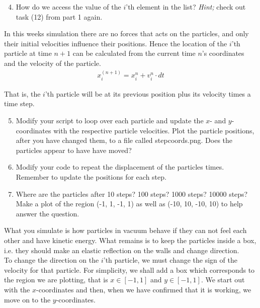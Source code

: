\documentclass{article}
\begin{document}
\begin{enumerate}
  \setcounter{enumi}{3}
  \item How do we access the value of the $i$'th element in the  list?
      {\em Hint;} check out task (12) from part 1 again.

\end{enumerate}

In this weeks simulation there are no forces that acts on the particles,
and only their initial velocities influence their positions.
Hence the location of the $i$'th particle at time $n+1$ can be
calculated from the current time $n$'s coordinates and the velocity of the
particle.
\begin{align}
  x_i^{(n+1)} = x^n_i + v_{i}^n \cdot dt
\end{align}

That is, the $i$'th particle will be at its previous position plus its
velocity times a time step.

\begin{enumerate}
  \setcounter{enumi}{4}
  \item
    Modify your script to loop over each particle and update the $x$- and
    $y$-coordinates with the respective particle velocities.
    Plot the particle positions, after you have changed them,
    to a file called stepcoords.png. Does the particles appear to have have moved?

  \item Modify your code to repeat the displacement of the particles  times.
      Remember to update the positions for each step.

  \item Where are the particles after 10 steps? 100 steps? 1000 steps? 10000 steps?
    Make a plot of the region (-1, 1, -1, 1) as well as (-10, 10, -10, 10) to
    help answer the question.

\end{enumerate}

What you simulate is how particles in vacuum behave if they can not feel
each other and have kinetic energy. What remains is to keep the particles
inside a box, i.e. they should make an elastic reflection on the walls and
change direction. \\

To change the direction on the $i$'th particle, we must change
the sign of the velocity for that particle. For simplicity, we shall add a box
which corresponds to the region we are plotting, that is $x \in [-1,1]$ 
and $y \in [-1,1]$.
We start out with the $x$-coordinates and then, when we
have confirmed that it is working, we move on to the $y$-coordinates.
\end{document}
